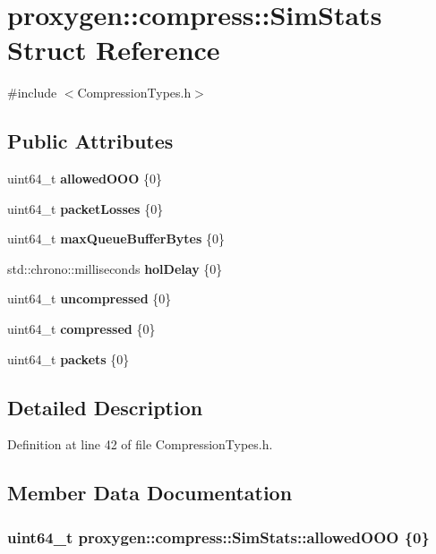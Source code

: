 \section{proxygen\+:\+:compress\+:\+:Sim\+Stats Struct Reference}
\label{structproxygen_1_1compress_1_1SimStats}


{\ttfamily \#include $<$Compression\+Types.\+h$>$}

\subsection*{Public Attributes}
\begin{DoxyCompactItemize}
\item 
uint64\+\_\+t {\bf allowed\+O\+OO} \{0\}
\item 
uint64\+\_\+t {\bf packet\+Losses} \{0\}
\item 
uint64\+\_\+t {\bf max\+Queue\+Buffer\+Bytes} \{0\}
\item 
std\+::chrono\+::milliseconds {\bf hol\+Delay} \{0\}
\item 
uint64\+\_\+t {\bf uncompressed} \{0\}
\item 
uint64\+\_\+t {\bf compressed} \{0\}
\item 
uint64\+\_\+t {\bf packets} \{0\}
\end{DoxyCompactItemize}


\subsection{Detailed Description}


Definition at line 42 of file Compression\+Types.\+h.



\subsection{Member Data Documentation}
\subsubsection[{allowed\+O\+OO}]{\setlength{\rightskip}{0pt plus 5cm}uint64\+\_\+t proxygen\+::compress\+::\+Sim\+Stats\+::allowed\+O\+OO \{0\}}\label{structproxygen_1_1compress_1_1SimStats_a49558095f027205213e7303eda1a9a46}



